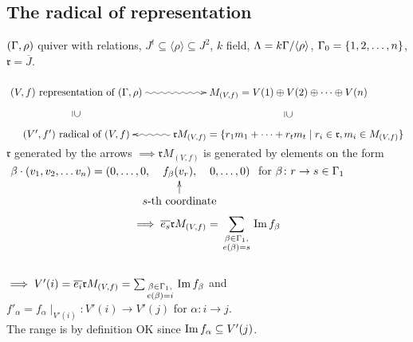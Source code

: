 \subsection{The radical of representation}
$(\Gamma, \rho)$ quiver with relations, $J^t \subseteq \langle \rho \rangle \subseteq J^2$, $k$ field, $\Lambda = k\Gamma / \langle \rho \rangle$, $\Gamma_0 = \{ 1, 2, \ldots , n \}$, $\mathfrak{r} = \overline{J}$.\\
\\
$\xymatrix
{
(V, f) \text{ representation of } (\G, \rho)\ar@{}[d]|-*[@]{\supseteq}\ar@{~>}[r] & M_{(V, f)} = V(1) \oplus V(2) \oplus \cdots \oplus V(n) \ar@{}[d]|-*[@]{\supseteq}\\
(V', f') \text{ radical of } (V, f)\ar@{<~}[r] & \mathfrak{r}M_{(V, f)} = \{ r_1m_1 + \cdots + r_tm_t \mid r_i \in \mathfrak{r}, m_i \in M_{(V, f)} \}\\
}
$\\
$\mathfrak{r}$ generated by the arrows $\implies \mathfrak{r}M_{(V,f)}$ is generated by elements on the form
$\xymatrix@C-3pc@R-1pc{\beta \cdot (v_1, v_2, \ldots v_n) = (0, \ldots, 0, & f_\beta(v_r), & 0, \ldots , 0 )\\
&s\text{-th coordinate}\ar[u]&}$ for $\beta \colon r \rightarrow s \in \Gamma_1$\\
$$\implies \overline{e_s}\mathfrak{r}M_{(V, f)} = \sum_{\begin{smallmatrix}
\beta \in \Gamma_1,\\ e(\beta)=s
\end{smallmatrix}} \operatorname{Im}\nolimits f_\beta$$\\
$\implies V'(i) =\overline{e_i}\mathfrak{r}M_{(V, f)}= \sum_{\begin{smallmatrix}
\beta \in \Gamma_1,\\ e(\beta)=i
\end{smallmatrix}} \operatorname{Im}\nolimits f_\beta$ and\\ $f'_\alpha = f_\alpha \mid_{V'(i)} \colon V'(i) \rightarrow V'(j)$ for $\alpha\colon i \rightarrow j$.\\
The range is by definition OK since $\operatorname{Im}\nolimits f_\alpha \subseteq V'(j)$.


